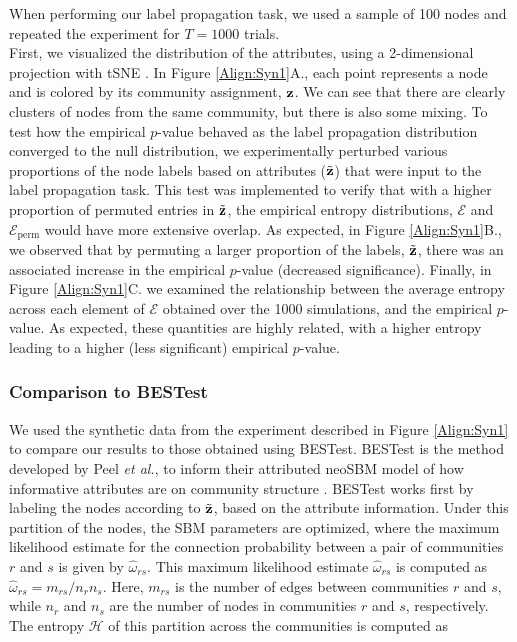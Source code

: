 When performing our label propagation task, we used a sample of 100 nodes and repeated the experiment for $T=1000$ trials. \\
\indent First, we visualized the distribution of the attributes, using a 2-dimensional projection with tSNE \cite{TwoD}. In Figure \ref{Align:Syn1}A., each point represents a node and is colored by its community assignment, ${\bf z}$. We can see that there are clearly clusters of nodes from the same community, but there is also some mixing. To test how the empirical $p$-value behaved as the label propagation distribution converged to the null distribution, we experimentally perturbed various proportions of the node labels based on attributes ($\tilde{\bf z}$) that were input to the label propagation task. This test was implemented to verify that with a higher proportion of permuted entries in $\tilde{\bf z}$, the empirical entropy distributions, $\mathcal{E}$ and $\mathcal{E}_{\text{perm}}$ would have more extensive overlap. As expected, in Figure \ref{Align:Syn1}B., we observed that by permuting a larger proportion of the labels, $\tilde{\bf z}$, there was an associated increase in the empirical $p$-value (decreased significance). Finally, in Figure \ref{Align:Syn1}C. we examined the relationship between the average entropy across each element of $\mathcal{E}$ obtained over the 1000 simulations, and the empirical $p$-value. As expected, these quantities are highly related, with a higher entropy leading to a higher (less significant) empirical $p$-value.


\subsubsection{Comparison to BESTest}
We used the synthetic data from the experiment described in Figure \ref{Align:Syn1} to compare our results to those obtained using BESTest. BESTest is the method developed by Peel \emph{et al.}, to inform their attributed neoSBM model of how informative attributes are on community structure \cite{peel2017ground}. BESTest works first by labeling the nodes according to $\tilde{\bf z}$, based on the attribute information. Under this partition of the nodes, the SBM parameters are optimized, where the maximum likelihood estimate for the connection probability between a pair of communities $r$ and $s$ is given by $\hat{\omega}_{rs}$. This maximum likelihood estimate $\hat{\omega}_{rs}$ is computed as $\hat{\omega}_{rs}=m_{rs}/n_{r}n_{s}$. Here, $m_{rs}$ is the number of edges between communities $r$ and $s$, while $n_{r}$ and $n_{s}$ are the number of nodes in communities $r$ and $s$, respectively. The entropy $\mathcal{H}$ of this partition across the communities is computed as

